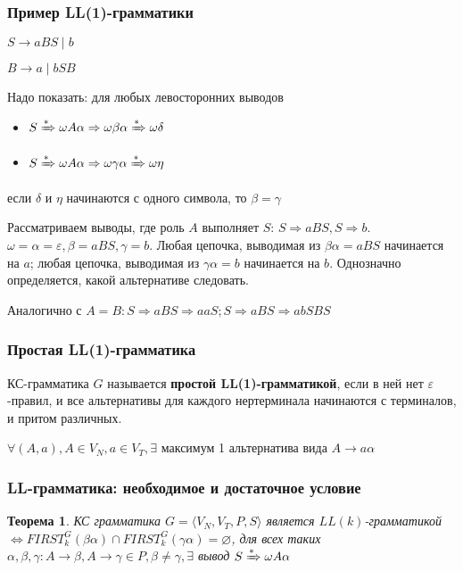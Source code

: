 \documentclass{beamer}
\newtheorem{rutheorem}{Теорема}
\newcommand{\derive}[0]{\xRightarrow[]{*}}
\begin{document}
\begin{frame}[fragile]
  \transwipe[direction=90]
  \frametitle{Пример LL(1)-грамматики}
  $S \to a B S \mid b$
  
  $B \to a \mid b S B$

  Надо показать: для любых левосторонних выводов
  \begin{itemize}
    \item $S \derive \omega A \alpha \Rightarrow \omega \beta \alpha \derive \omega \delta$
    \item $S \derive \omega A \alpha \Rightarrow \omega \gamma \alpha \derive \omega \eta$
  \end{itemize} 
  если $\delta$ и $\eta$ начинаются с одного символа, то $\beta = \gamma$
  
  Рассматриваем выводы, где роль $A$ выполняет $S$: $S \Rightarrow a B S, S \Rightarrow b$. $\omega = \alpha = \varepsilon, \beta = a B S, \gamma = b$. Любая цепочка, выводимая из $\beta \alpha = a B S$ начинается на $a$; любая цепочка, выводимая из $\gamma \alpha = b$ начинается на $b$. Однозначно определяется, какой альтернативе следовать. 
  
  Аналогично с $A = B: S \Rightarrow a B S \Rightarrow a a S; S \Rightarrow a B S \Rightarrow a b S B S$ 
\end{frame}


\begin{frame}[fragile]
  \transwipe[direction=90]
  \frametitle{Простая LL(1)-грамматика}
  КС-грамматика $G$ называется \textbf{простой LL(1)-грамматикой}, если в ней нет $\varepsilon$-правил, и все альтернативы для каждого нертерминала начинаются с терминалов, и притом различных. 
  
  \vfill 
  
  $\forall (A, a), A \in V_N, a \in V_T, \exists $ максимум 1 альтернатива вида $A \to a \alpha$
  
\end{frame}


\begin{frame}[fragile]
  \transwipe[direction=90]
  \frametitle{LL-грамматика: необходимое и достаточное условие}
  \begin{rutheorem}
  КС грамматика $G = \langle V_N, V_T, P, S \rangle$ является $LL(k)$-грамматикой $\Leftrightarrow FIRST^G_k(\beta \alpha) \cap FIRST^G_k(\gamma \alpha) = \varnothing$, для всех таких $\alpha, \beta, \gamma: A \to \beta, A \to \gamma \in P, \beta \neq \gamma, \exists$ вывод $S \derive \omega A \alpha$
  \end{rutheorem}  

\end{frame}
\end{document}
